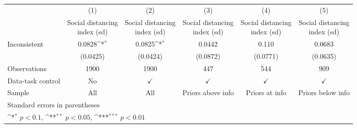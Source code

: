 {
\def\sym#1{\ifmmode^{#1}\else\(^{#1}\)\fi}
\begin{tabular}{l*{5}{c}}
\hline\hline
                    &\multicolumn{1}{c}{(1)}         &\multicolumn{1}{c}{(2)}         &\multicolumn{1}{c}{(3)}         &\multicolumn{1}{c}{(4)}         &\multicolumn{1}{c}{(5)}         \\
                    &\shortstack{Social distancing \\ index (sd)}         &\shortstack{Social distancing \\ index (sd)}         &\shortstack{Social distancing \\ index (sd)}         &\shortstack{Social distancing \\ index (sd)}         &\shortstack{Social distancing \\ index (sd)}         \\
\hline
Inconsistent        &      0.0828\sym{*}  &      0.0825\sym{*}  &      0.0442         &       0.110         &      0.0683         \\
                    &    (0.0425)         &    (0.0424)         &    (0.0872)         &    (0.0771)         &    (0.0635)         \\
\hline
Observations        &        1900         &        1900         &         447         &         544         &         909         \\
Data-task control   &          No         &$\checkmark$         &$\checkmark$         &$\checkmark$         &$\checkmark$         \\
Sample              &         All         &         All         &Priors above info         &Priors at info         &Priors below info         \\
\hline\hline
\multicolumn{6}{l}{\footnotesize Standard errors in parentheses}\\
\multicolumn{6}{l}{\footnotesize \sym{*} \(p<0.1\), \sym{**} \(p<0.05\), \sym{***} \(p<0.01\)}\\
\end{tabular}
}
